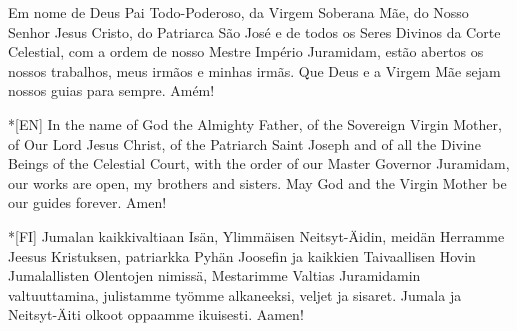 \begin{intersong}
  \begin{passage}[PT]{}
    Em nome de Deus Pai Todo-Poderoso, da Virgem Soberana Mãe,
    do Nosso Senhor Jesus Cristo, do Patriarca São José e de
    todos os Seres Divinos da Corte Celestial, com a ordem de
    nosso Mestre Império Juramidam, estão abertos os nossos
    trabalhos, meus irmãos e minhas irmãs. Que Deus e a Virgem Mãe
    sejam nossos guias para sempre. Amém!
  \end{passage}
  \begin{passage}*[EN]{}
    In the name of God the Almighty Father, of the Sovereign Virgin
    Mother, of Our Lord Jesus Christ, of the Patriarch Saint Joseph and of
    all the Divine Beings of the Celestial Court, with the order of our Master
    Governor Juramidam, our works are open, my brothers and sisters.
    May God and the Virgin Mother be our guides forever. Amen!
  \end{passage}
  \begin{passage}*[FI]{}
    Jumalan kaikkivaltiaan Isän, Ylimmäisen Neitsyt-Äidin,
    meidän Herramme Jeesus Kristuksen, patriarkka Pyhän Joosefin ja
    kaikkien Taivaallisen Hovin Jumalallisten Olentojen nimissä,
    Mestarimme Valtias Juramidamin valtuuttamina, julistamme työmme alkaneeksi,
    veljet ja sisaret. Jumala ja Neitsyt-Äiti olkoot oppaamme ikuisesti. Aamen!
  \end{passage}
  \vfill
\end{intersong}


